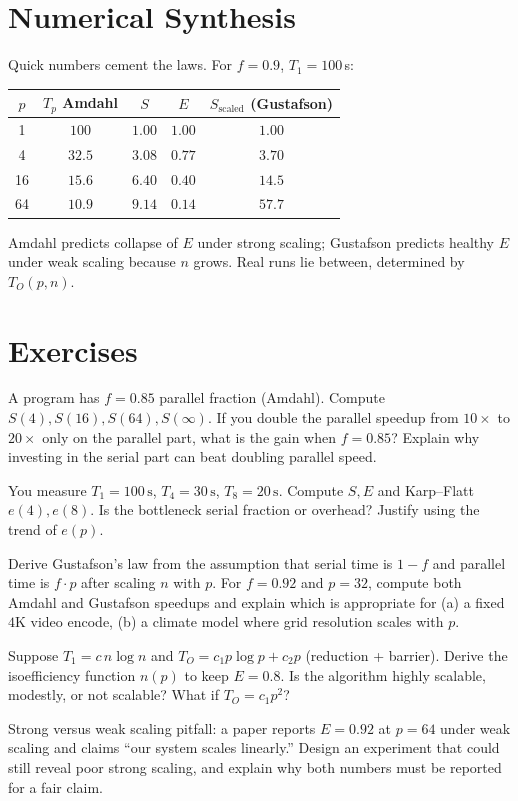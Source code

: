 \section{Numerical Synthesis}
Quick numbers cement the laws. For $f=0.9$, $T_{1}=100\,$s:
\begin{center}\small\begin{tabular}{c|c|c|c|c}
$p$ & $T_{p}$ Amdahl & $S$ & $E$ & $S_{\text{scaled}}$ (Gustafson)\\ \hline
1 & $100$ & $1.00$ & $1.00$ & $1.00$ \\
4 & $32.5$ & $3.08$ & $0.77$ & $3.70$ \\
16& $15.6$ & $6.40$ & $0.40$ & $14.5$ \\
64& $10.9$ & $9.14$ & $0.14$ & $57.7$ \\
\end{tabular}\end{center}
Amdahl predicts collapse of $E$ under strong scaling; Gustafson predicts healthy $E$ under weak scaling because $n$ grows. Real runs lie between, determined by $T_{O}(p,n)$.

\section{Exercises}
\begin{exercise}
A program has $f=0.85$ parallel fraction (Amdahl). Compute $S(4),S(16),S(64),S(\infty)$. If you double the parallel speedup from $10\times$ to $20\times$ only on the parallel part, what is the gain when $f=0.85$? Explain why investing in the serial part can beat doubling parallel speed.
\end{exercise}
\begin{exercise}
You measure $T_{1}=100\,\text{s}$, $T_{4}=30\,\text{s}$, $T_{8}=20\,\text{s}$. Compute $S,E$ and Karp--Flatt $e(4),e(8)$. Is the bottleneck serial fraction or overhead? Justify using the trend of $e(p)$.
\end{exercise}
\begin{exercise}
Derive Gustafson's law from the assumption that serial time is $1-f$ and parallel time is $f\cdot p$ after scaling $n$ with $p$. For $f=0.92$ and $p=32$, compute both Amdahl and Gustafson speedups and explain which is appropriate for (a) a fixed $4$K video encode, (b) a climate model where grid resolution scales with $p$.
\end{exercise}
\begin{exercise}
Suppose $T_{1}=c\,n\log n$ and $T_{O}=c_{1}p\log p + c_{2}p$ (reduction + barrier). Derive the isoefficiency function $n(p)$ to keep $E=0.8$. Is the algorithm highly scalable, modestly, or not scalable? What if $T_{O}=c_{1}p^{2}$?
\end{exercise}
\begin{exercise}
Strong versus weak scaling pitfall: a paper reports $E=0.92$ at $p=64$ under weak scaling and claims ``our system scales linearly.'' Design an experiment that could still reveal poor strong scaling, and explain why both numbers must be reported for a fair claim.
\end{exercise}


